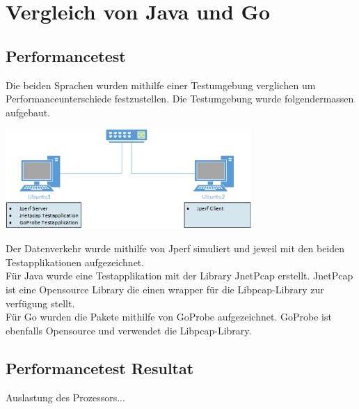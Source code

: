 \section{Vergleich von Java und Go}
\label{sec:Vergleich von Java und Go}

\subsection{Performancetest}
Die beiden Sprachen wurden mithilfe einer Testumgebung verglichen um Performanceunterschiede festzustellen. Die Testumgebung wurde folgendermassen aufgebaut.

\includegraphics[width=0.7\textwidth]{start/img/PerformanceEvaluation.png}

Der Datenverkehr wurde mithilfe von Jperf simuliert und jeweil mit den beiden Testapplikationen aufgezeichnet.\\
Für Java wurde eine Testapplikation mit der Library JnetPcap erstellt. JnetPcap ist eine Opensource Library die einen wrapper für die Libpcap-Library zur verfügung stellt.\\
Für Go wurden die Pakete mithilfe von GoProbe aufgezeichnet. GoProbe ist ebenfalls Opensource und verwendet die Libpcap-Library.

\subsection{Performancetest Resultat}
Auslastung des Prozessors...
